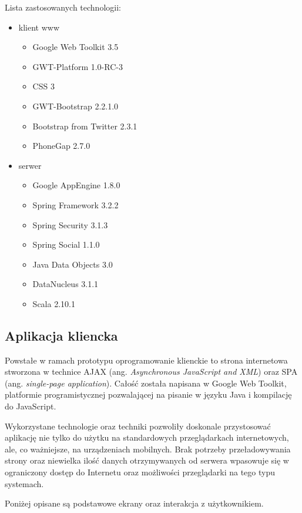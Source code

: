 Lista zastosowanych technologii:
\begin{itemize}
  
  \item klient www
  \begin{itemize}
    \item Google Web Toolkit 3.5
    \item GWT-Platform 1.0-RC-3
    \item CSS 3
    \item GWT-Bootstrap 2.2.1.0
    \item Bootstrap from Twitter 2.3.1
    \item PhoneGap 2.7.0
  \end{itemize}
  
  \item serwer
  \begin{itemize}
    \item Google AppEngine 1.8.0
    \item Spring Framework 3.2.2
    \item Spring Security 3.1.3
    \item Spring Social 1.1.0
    \item Java Data Objects 3.0
    \item DataNucleus 3.1.1
    \item Scala 2.10.1
  \end{itemize}
\end{itemize}

\subsection{Aplikacja kliencka}
Powstałe w ramach prototypu oprogramowanie klienckie to strona internetowa
stworzona w technice AJAX (ang. \textit{Asynchronous JavaScript and XML}) oraz
SPA (ang. \textit{single-page application}). Całość została napisana w Google
Web Toolkit, platformie programistycznej pozwalającej na pisanie w języku Java i
kompilację do JavaScript. 

Wykorzystane technologie oraz techniki pozwoliły doskonale przystosować
aplikację nie tylko do użytku na standardowych przeglądarkach internetowych,
ale, co ważniejsze, na urządzeniach mobilnych. Brak potrzeby przeładowywania
strony oraz niewielka ilość danych otrzymywanych od serwera wpasowuje się w
ograniczony dostęp do Internetu oraz możliwości przeglądarki na tego typu
systemach.

Poniżej opisane są podstawowe ekrany oraz interakcja z użytkownikiem.


